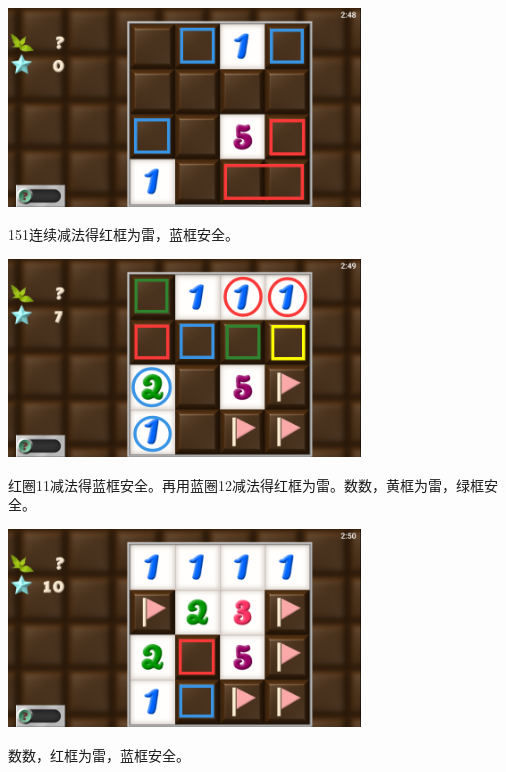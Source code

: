 \subsection{} %
\begin{center}
    \includegraphics[width=0.7\textwidth]{puzzle/34-1.png}
\end{center}
151连续减法得红框为雷，蓝框安全。
\begin{center}
    \includegraphics[width=0.7\textwidth]{puzzle/34-2.png}
\end{center}
红圈11减法得蓝框安全。再用蓝圈12减法得红框为雷。数数，黄框为雷，绿框安全。
\begin{center}
    \includegraphics[width=0.7\textwidth]{puzzle/34-3.png}
\end{center}
数数，红框为雷，蓝框安全。

